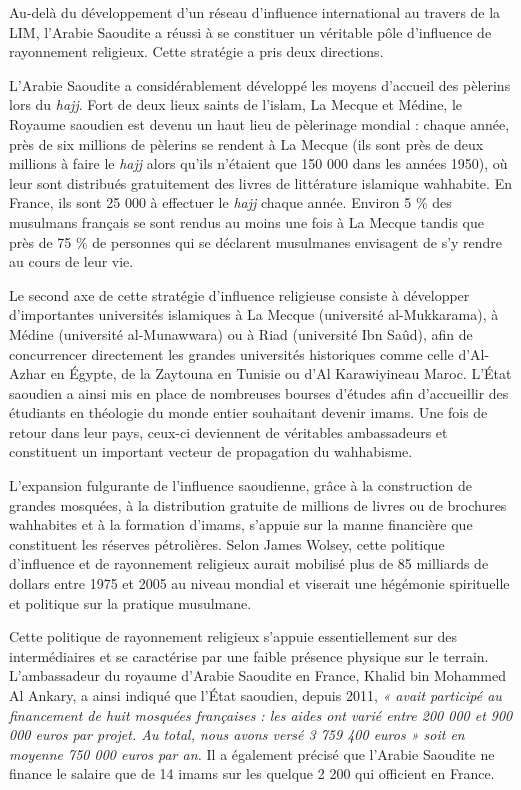 Au-delà du développement d'un réseau d'influence international au
travers de la LIM, l'Arabie Saoudite a réussi à se constituer un
véritable pôle d'influence de rayonnement religieux. Cette stratégie a
pris deux directions.

L'Arabie Saoudite a considérablement développé les moyens d'accueil des
pèlerins lors du \emph{hajj}. Fort de deux lieux saints de l'islam, La
Mecque et Médine, le Royaume saoudien est devenu un haut lieu de
pèlerinage mondial : chaque année, près de six millions de pèlerins se
rendent à La Mecque (ils sont près de deux millions à faire le
\emph{hajj} alors qu'ils n'étaient que 150 000 dans les années 1950), où
leur sont distribués gratuitement des livres de littérature islamique
wahhabite. En France, ils sont 25 000 à effectuer le \emph{hajj} chaque
année. Environ 5 \% des musulmans français se sont rendus au moins une
fois à La Mecque tandis que près de 75 \% de personnes qui se déclarent
musulmanes envisagent de s'y rendre au cours de leur vie.

Le second axe de cette stratégie d'influence religieuse consiste à
développer d'importantes universités islamiques à La Mecque (université
al-Mukkarama), à Médine (université al-Munawwara) ou à Riad (université
Ibn Saûd), afin de concurrencer directement les grandes universités
historiques comme celle d'Al-Azhar en Égypte, de la Zaytouna en Tunisie
ou d'Al Karawiyineau Maroc. L'État saoudien a ainsi mis en place de
nombreuses bourses d'études afin d'accueillir des étudiants en théologie
du monde entier souhaitant devenir imams. Une fois de retour dans leur
pays, ceux-ci deviennent de véritables ambassadeurs et constituent un
important vecteur de propagation du wahhabisme.

L'expansion fulgurante de l'influence saoudienne, grâce à la
construction de grandes mosquées, à la distribution gratuite de millions
de livres ou de brochures wahhabites et à la formation d'imams, s'appuie
sur la manne financière que constituent les réserves pétrolières. Selon
James Wolsey, cette politique d'influence et de rayonnement religieux
aurait mobilisé plus de 85 milliards de dollars entre 1975 et 2005 au
niveau mondial et viserait une hégémonie spirituelle et politique sur
la pratique musulmane.

Cette politique de rayonnement religieux s'appuie essentiellement sur
des intermédiaires et se caractérise par une faible présence physique
sur le terrain. L'ambassadeur du royaume d'Arabie Saoudite en France,
Khalid bin Mohammed Al Ankary, a ainsi indiqué que l'État saoudien,
depuis 2011, \emph{« avait participé au financement de huit mosquées
françaises : les aides ont varié entre 200 000 et 900 000
euros par projet. Au total, nous avons versé 3 759 400 euros » soit en
moyenne 750 000 euros par an.} Il a également précisé que l'Arabie
Saoudite ne finance le salaire que de 14 imams sur les quelque 2 200 qui
officient en France.




